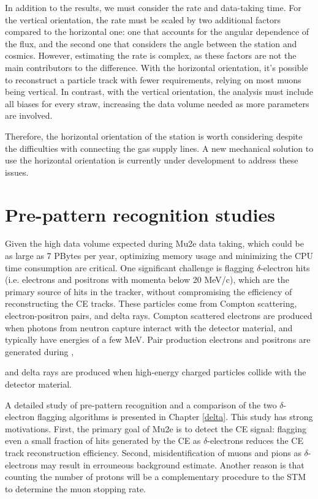 In addition to the results, we must consider the rate and  data-taking time. 
For the vertical orientation, the rate must be scaled by two additional 
factors compared to the horizontal one: one that accounts for the 
angular dependence of the flux, and the second one that considers the angle between the station and cosmics. 
However, estimating the rate is complex, as these factors are not the main contributors to the difference. 
With the horizontal orientation, it's possible to reconstruct a particle track with 
fewer requirements, relying on most muons being vertical. In contrast, with the 
vertical orientation, the analysis must include all biases for every straw, increasing 
the data volume needed as more parameters are involved.

Therefore, the horizontal orientation of the station is worth considering despite the difficulties
with connecting the gas supply lines.
A new mechanical solution to use the horizontal orientation is currently under development to address these issues.




\section{Pre-pattern recognition studies}

Given the high data volume expected during Mu2e data taking, 
which could be as large as 7 PBytes per year,
optimizing memory usage and minimizing the CPU time consumption are critical.
One significant challenge is flagging $\delta$-electron hits (i.e. electrons and positrons 
with momenta below 20 MeV/c), which are the primary source 
of hits in the tracker, without compromising the efficiency of 
reconstructing the CE tracks. These particles come from Compton 
scattering, electron-positron pairs, 
and delta rays. Compton scattered electrons 
are produced when photons from neutron capture interact with the 
detector material, and typically have energies of a few MeV.
Pair production electrons and positrons 
are generated during ,

and delta rays are produced 
when high-energy charged particles collide with the detector material.

A detailed study of pre-pattern recognition and a comparison of the two 
$\delta$-electron flagging algorithms is presented 
in Chapter \ref{delta}. This study has strong motivations. First, the primary goal of Mu2e is 
to detect the CE signal: flagging even a small fraction of hits generated 
by the CE as $\delta$-electrons reduces the CE track 
reconstruction efficiency. Second, misidentification of muons 
and pions as $\delta$-electrons may result in errouneous background estimate. 
Another reason is that counting the number of protons will be a complementary procedure to the 
STM to determine the muon stopping rate.



